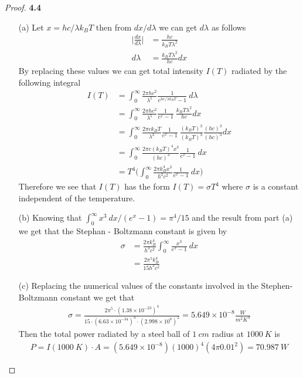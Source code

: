 \documentclass[11pt]{article}
\theoremstyle{definition}
\begin{document}
\cleardoublepage
\begin{proof}{\textbf{4.4}}
\begin{itemize}
    \item [(a)] Let $x = hc/\lambda k_B T$ then from $dx/d\lambda$ we can get
    $d\lambda$ as follows
    \begin{align*}
        \bigg|\frac{dx}{d\lambda}\bigg| &= \frac{hc}{k_B T \lambda^2}\\
        d\lambda &= \frac{k_B T \lambda^2}{hc} dx
    \end{align*}
    By replacing these values we can get total intensity $I(T)$ radiated
    by the following integral
    \begin{align*}
        I(T) &= \int_0^\infty \frac{2\pi h c^2}{\lambda^5}
        \frac{1}{e^{hc/\lambda k_B T} - 1}~d\lambda\\
        &= \int_0^\infty \frac{2\pi h c^2}{\lambda^5}
        \frac{1}{e^{x} - 1}~\frac{k_B T \lambda^2}{hc} dx\\
        &= \int_0^\infty \frac{2\pi c k_B T}{\lambda^3}
        \frac{1}{e^{x} - 1}~\frac{(k_B T)^3}{(k_B T)^3}\frac{(hc)^3}{(hc)^3} dx\\
        &= \int_0^\infty \frac{2\pi c (k_B T)^4x^3}{(hc)^3} 
        \frac{1}{e^{x} - 1}~ dx\\
        &= T^4 \bigg(\int_0^\infty \frac{2\pi k_B^4x^3}{h^3c^2} 
        \frac{1}{e^{x} - 1}~ dx\bigg)
    \end{align*}
    Therefore we see that $I(T)$ has the form $I(T) = \sigma T^4$ where
    $\sigma$ is a constant independent of the temperature.
    
    \item [(b)] Knowing that $\int_0^\infty x^3~dx/(e^x - 1) = \pi^4/15$
    and the result from part (a) we get that the Stephan - Boltzmann constant
    is given by
    \begin{align*}
        \sigma &= \frac{2\pi k_B^4}{h^3c^2} \int_0^\infty 
        \frac{x^3}{e^{x} - 1}~ dx\\
        &= \frac{2\pi^5 k_B^4}{15 h^3c^2}
    \end{align*}

    \item [(c)] Replacing the numerical values of the constants involved in
    the Stephen-Boltzmann constant we get that
    \begin{align*}
        \sigma = \frac{2\pi^5 \cdot (1.38 \times 10^{-23})^4}
        {15 \cdot (6.63 \times 10^{-34})^3 \cdot (2.998 \times 10^8)^2}
        = 5.649 \times 10^{-8} \frac{W}{m^2K^4}
    \end{align*}
    Then the total power radiated by a steel ball of $1~cm$ radius at $1000~K$
    is 
    \begin{align*}
        P = I(1000~K)\cdot A = (5.649 \times 10^{-8}) (1000)^4 (4\pi 0.01^2)
        = 70.987~W
    \end{align*}
\end{itemize}
\end{proof}
\end{document}
